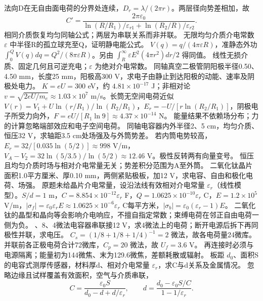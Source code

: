 \workings 法向D在无自由面电荷的分界处连续，$D_r=\lambda/(2\pi r)$。两层径向势差相加，故
\[
C'=\frac{2\pi\varepsilon_0}{\ln(R/R_1)/\varepsilon_{r1}+\ln(R_2/R)/\varepsilon_{r2}}.
\]
\crosscheck 相同介质恢复均匀同轴公式；两层为串联关系而非并联。
\problemtext 无限均匀介质介电常数 $\varepsilon$ 中半径R的孤立球充至Q，证明静电能公式。
\workings $V(q)=q/(4\pi\varepsilon R)$，准静态外功 $\int_0^Q V(q)dq=Q^2/(8\pi\varepsilon R)$。另由 $\int_R^\infty\varepsilon E^2(4\pi r^2)dr/2$ 得同值。
\crosscheck 线性无损介质、固定几何且可逆充电；$\varepsilon$ 为绝对介电常数。
\problemtext 同轴真空二极管阴阳极半径0.50、4.50 mm，长度25 mm，阳极高300 V，求电子由静止到达阳极的动能、速率及阴极处电力。
\workings $K=eU=300$ eV，约 $4.81\times10^{-17}$ J；非相对论 $v=\sqrt{2eU/m_e}\approx1.03\times10^7$ m/s。长筒无空间电荷近似 $V(r)=V_1+U\ln(r/R_1)/\ln(R_2/R_1)$，$E_r=-U/[r\ln(R_2/R_1)]$，阴极电子所受力向外，$F=eU/[R_1\ln9]\approx4.37\times10^{-14}$ N。
\crosscheck 能量结果不依赖场分布；力的计算忽略端部效应和电子空间电荷。
\problemtext 同轴电容器内外半径2、5 cm，均匀介质、恒压32 V，求轴距3.5 cm处场强及与外筒势差。
\workings 若内筒电势较高，$E_r=32/[0.035\ln(5/2)]\approx998$ V/m，$V_A-V_2=32\ln(5/3.5)/\ln(5/2)\approx12.46$ V。极性反转两有向量变号。
\crosscheck 恒压且均匀介质时场与相对介电常量无关；势差积分范围为A至外筒。
\problemtext 二氧化钛晶片面积1.0平方厘米、厚0.10 mm，两侧紧贴极板，加12 V，求电容、自由和极化电荷、场强。
\workings 原题未给晶片介电常量，设沿法线有效相对介电常量 $\varepsilon_r$（线性模型）。$S/d=1$ m，$C=8.854\times10^{-12}\varepsilon_r$ F，$Q=1.0625\times10^{-10}\varepsilon_r$ C，$E=1.2\times10^5$ V/m，$|\sigma_f|=\varepsilon_0\varepsilon_r E\approx1.0625\times10^{-6}\varepsilon_r$ C每平方米，$|\sigma_b|=\varepsilon_0(\varepsilon_r-1)E$。
\crosscheck 二氧化钛的晶型和晶向等会影响介电响应，不擅自指定常数；束缚电荷在邻正自由电荷一侧为负。
、8、4微法电容器串联接12 V，求4微法上的电荷；断开电源后拆下再同极性并联，求电压。
\workings $C_s=(1/8+1/8+1/4)^{-1}=2$ 微法，故各电荷量24微库。并联前各正极电荷合计72微库，$C_p=20$ 微法，故 $U_f=3.6$ V。
\crosscheck 再连接时必须与电源隔离；能量初为144微焦、末为129.6微焦，差额耗散或辐射。
\problemtext 板距 $d_0$、面积S的电容式测厚传感器，材料厚d、相对介电常量 $\varepsilon_r$，求C与d关系及金属情况。
\workings 忽略边缘且试样覆盖有效面积，空气与介质串联，
\[
C=\frac{\varepsilon_0S}{d_0-d+d/\varepsilon_r},\qquad
d=\frac{d_0-\varepsilon_0S/C}{1-1/\varepsilon_r}.
\]
